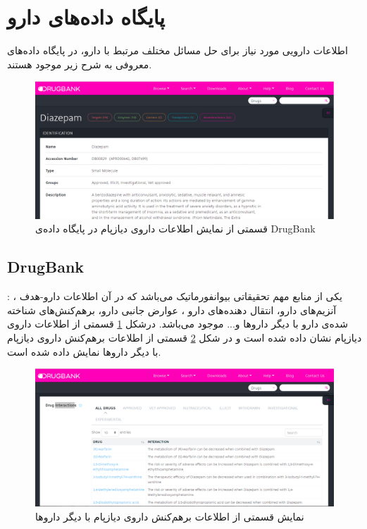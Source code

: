 \section{پایگاه داده‌های دارو
\label{data base}}
 
اطلاعات دارویی مورد نیاز برای حل مسائل مختلف مرتبط با دارو، در پایگاه داده‌های معروفی به شرح زیر موجود هستند. 
 
\begin{figure}[h!]
	\centering
	\includegraphics[scale=0.48]{section1/di.jpg}
	\caption{
قسمتی از نمایش اطلاعات داروی دیازپام در پایگاه داده‌ی
DrugBank}
	\label{fs1}
\end{figure}


\subsection{DrugBank}

\cite{law2013drugbank,wishart2007drugbank,knox2010drugbank,wishart2006drugbank}:
یکی از منابع مهم تحقیقاتی بیوانفورماتیک می‌باشد که در آن اطلاعات دارو-هدف
،
آنزیم‌های دارو، انتقال‌ دهنده‌های دارو
‌،
عوارض جانبی
دارو، برهم‌کنش‌های شناخته شده‌ی دارو با دیگر داروها و... موجود می‌باشد. درشکل
\ref{fs1} 
قسمتی از  اطلاعات داروی دیازپام
نشان‌ داده‌ شده‌ است و در شکل 
\ref{fs2} 
قسمتی از اطلاعات برهم‌کنش داروی دیازپام با دیگر داروها نمایش داده شده‌ است. 

\begin{figure}[h!]
	\centering
	\includegraphics[scale=0.48]{section1/ddidi.png}
	\caption{
نمایش قسمتی از اطلاعات برهم‌کنش داروی دیازپام با دیگر داروها
	}
	\label{fs2}
\end{figure}

